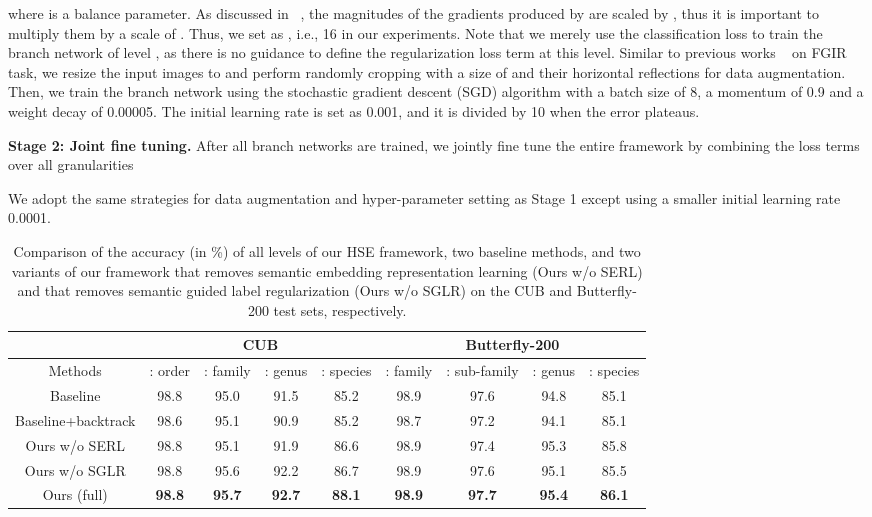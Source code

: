 \documentclass[sigconf]{acmart}
\begin{document}
where  is a balance parameter. As discussed in ~\cite{hinton2015distilling}, the magnitudes of the gradients produced by  are scaled by , thus it is important to multiply them by a scale of . Thus, we set  as , i.e., 16 in our experiments. Note that we merely use the classification loss  to train the branch network of level , as there is no guidance to define the regularization loss term at this level. Similar to previous works ~\cite{liu2016fully,lin2015bilinear} on FGIR task, we resize the input images to  and perform randomly cropping with a size of  and their horizontal reflections for data augmentation. Then, we train the branch network using the stochastic gradient descent (SGD) algorithm with a batch size of 8, a momentum of 0.9 and a weight decay of 0.00005. The initial learning rate is set as 0.001, and it is divided by 10 when the error plateaus.

\noindent\textbf{Stage 2: Joint fine tuning. }After all branch networks are trained, we jointly fine tune the entire framework by combining the loss terms over all granularities

We adopt the same strategies for data augmentation and hyper-parameter setting as Stage 1 except using a smaller initial learning rate 0.0001.

\begin{table*}[htp]
\centering
\begin{tabular}{c|c|c|c|c||c|c|c|c}
\hline
& \multicolumn{4}{c||}{CUB} &\multicolumn{4}{c}{Butterfly-200} \\
\hline
\centering  Methods  & : order & : family  & : genus & : species & : family & : sub-family  & : genus & : species\\
\hline
\hline
Baseline & 98.8 & 95.0 & 91.5 & 85.2 & 98.9 & 97.6 & 94.8 & 85.1 \\
Baseline+backtrack & 98.6 & 95.1 & 90.9 & 85.2 & 98.7 & 97.2 & 94.1 & 85.1 \\
\hline
\hline 
Ours w/o SERL  & 98.8 & 95.1 & 91.9 & 86.6 & 98.9 & 97.4 & 95.3 & 85.8\\
Ours w/o SGLR  & 98.8 & 95.6 & 92.2 & 86.7 & 98.9 & 97.6 & 95.1 & 85.5 \\
Ours (full) & \textbf{98.8} & \textbf{95.7} & \textbf{92.7} & \textbf{88.1} & \textbf{98.9} & \textbf{97.7} & \textbf{95.4} & \textbf{86.1} \\
\hline
\end{tabular}
\caption{Comparison of the accuracy (in \%) of all levels of our HSE framework, two baseline methods, and two variants of our framework that removes semantic embedding representation learning (Ours w/o SERL) and that removes semantic guided label regularization (Ours w/o SGLR) on the CUB and Butterfly-200 test sets, respectively.}
\label{table:result1}
\end{table*}
\end{document}
